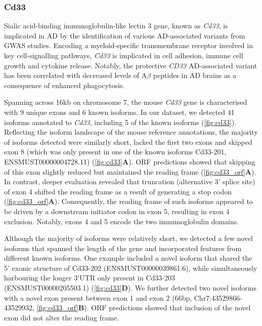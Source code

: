 \newpage
\subsubsection{Cd33}
\label{ch5: cd33_annotation}
Sialic acid-binding immunoglobulin-like lectin 3 gene, known as \textit{Cd33}, is implicated in AD by the identification of various AD-associated variants from GWAS studies. Encoding a myeloid-specific transmembrane receptor involved in key cell-signalling pathways, \textit{Cd33} is implicated in cell adhesion, immune cell growth and cytokine release\cite{Griciuc2019}. Notably, the protective \textit{CD33} AD-associated variant has been correlated with decreased levels of A$\beta$ peptides in AD brains as a consequence of enhanced phagocytosis\cite{Bhattacherjee2021}. 

Spanning across 16kb on chromosome 7, the mouse \textit{Cd33} gene is characterised with 9 unique exons and 6 known isoforms. In our dataset, we detected 41 isoforms annotated to \textit{Cd33}, including 5 of the known isoforms (\cref{fig:cd33}). Reflecting the isoform landscape of the mouse reference annotations, the majority of isoforms detected were similarly short, lacked the first two exons and skipped exon 8 (which was only present in one of the known isoforms Cd33-201, ENSMUST00000004728.11) (\cref{fig:cd33}\textbf{A}). ORF predictions showed that skipping of this exon slightly reduced but maintained the reading frame (\cref{fig:cd33_orf}\textbf{A}). In contrast, deeper evaluation revealed that truncation (alternative 3' splice site) of exon 4 shifted the reading frame as a result of generating a stop codon (\cref{fig:cd33_orf}\textbf{A}). Consequently, the reading frame of such isoforms appeared to be driven by a downstream initiator codon in exon 5, resulting in exon 4 exclusion. Notably, exons 4 and 5 encode the two immunoglobulin domains.  

Although the majority of isoforms were relatively short, we detected a few novel isoforms that spanned the length of the gene and incorporated features from different known isoforms. One example included a novel isoform that shared the 5' exonic structure of Cd33-202 (ENSMUST00000039861.6), while simultaneously harbouring the longer 3'UTR only present in Cd33-203 (ENSMUST00000205503.1) (\cref{fig:cd33}\textbf{D}). We further detected two novel isoforms with a novel exon present between exon 1 and exon 2  (66bp, Chr7:43529866-43529932, \cref{fig:cd33_orf}\textbf{B}). ORF predictions showed that inclusion of the novel exon did not alter the reading frame. 

